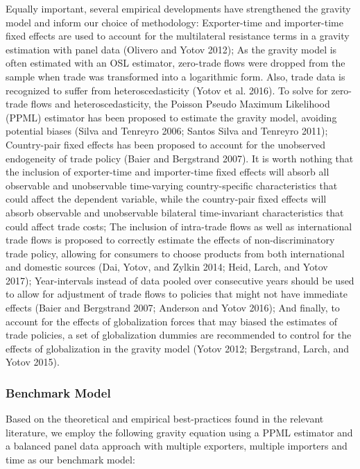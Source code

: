 \documentclass[12pt]{article}%
\begin{document}
Equally important, several empirical developments have strengthened the
gravity model and inform our choice of methodology: Exporter-time and
importer-time fixed effects are used to account for the multilateral
resistance terms in a gravity estimation with panel data (Olivero and
Yotov 2012); As the gravity model is often estimated with an OSL
estimator, zero-trade flows were dropped from the sample when trade was
transformed into a logarithmic form. Also, trade data is recognized to
suffer from heteroscedasticity (Yotov et al. 2016). To solve for
zero-trade flows and heteroscedasticity, the Poisson Pseudo Maximum
Likelihood (PPML) estimator has been proposed to estimate the gravity
model, avoiding potential biases (Silva and Tenreyro 2006; Santos Silva
and Tenreyro 2011); Country-pair fixed effects has been proposed to
account for the unobserved endogeneity of trade policy (Baier and
Bergstrand 2007). It is worth nothing that the inclusion of
exporter-time and importer-time fixed effects will absorb all observable
and unobservable time-varying country-specific characteristics that
could affect the dependent variable, while the country-pair fixed
effects will absorb observable and unobservable bilateral time-invariant
characteristics that could affect trade costs; The inclusion of
intra-trade flows as well as international trade flows is proposed to
correctly estimate the effects of non-discriminatory trade policy,
allowing for consumers to choose products from both international and
domestic sources (Dai, Yotov, and Zylkin 2014; Heid, Larch, and Yotov
2017); Year-intervals instead of data pooled over consecutive years
should be used to allow for adjustment of trade flows to policies that
might not have immediate effects (Baier and Bergstrand 2007; Anderson
and Yotov 2016); And finally, to account for the effects of
globalization forces that may biased the estimates of trade policies, a
set of globalization dummies are recommended to control for the effects
of globalization in the gravity model (Yotov 2012; Bergstrand, Larch,
and Yotov 2015).%
\subsubsection{Benchmark Model}%
\label{ssubsec:BenchmarkModel}%

%
Based on the theoretical and empirical best-practices found in the
relevant literature, we employ the following gravity equation using a
PPML estimator and a balanced panel data approach with multiple
exporters, multiple importers and time as our benchmark model:
\end{document}
